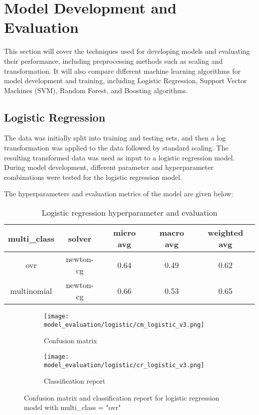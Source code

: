 \chapter{Model Development and Evaluation}
This section will cover the techniques used for developing models and evaluating their performance, including preprocessing methods such as scaling and transformation. It will also compare different machine learning algorithms for model development and training, including Logistic Regression, Support Vector Machines (SVM), Random Forest, and Boosting algorithms.


\section{Logistic Regression}
The data was initially split into training and testing sets, and then a log transformation was applied to the data followed by standard scaling. The resulting transformed data was used as input to a logistic regression model. During model development, different parameter and hyperparameter combinations were tested for the logistic regression model.

The hyperparameters and evaluation metrics of the model are given below:

\begin{table}[H]
    \begin{center}
        \begin{tabular}{ |c|c|c|c|c| }
            \hline
            multi\_class &
            solver       & micro avg & macro avg & weighted avg        \\
            \hline
            ovr          & newton-cg & 0.64      & 0.49         & 0.62 \\
            \hline
            multinomial  & newton-cg & 0.66      & 0.53         & 0.65 \\
            \hline
        \end{tabular}
    \end{center}
    \caption{Logistic regression hyperparameter and evaluation}
    \label{table:}
\end{table}

\begin{figure}[H]
    \centering
    \begin{subfigure}[b]{0.4\textwidth}
        \texttt{[image: model\_evaluation/logistic/cm\_logistic\_v3.png]}
        \caption{Confusion matrix}
    \end{subfigure}
    \hfill
    \begin{subfigure}[b]{0.4\textwidth}
        \texttt{[image: model\_evaluation/logistic/cr\_logistic\_v3.png]}
        \caption{Classification report}
    \end{subfigure}
    \caption{Confusion matrix and classification report for logistic regression model with multi\_class = "ovr"}
\end{figure}

